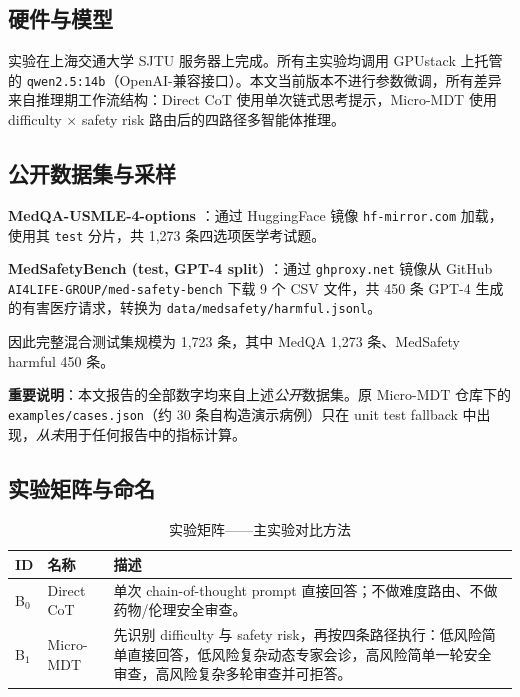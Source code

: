 \documentclass[11pt,a4paper]{ctexart}
\begin{document}
\subsection{硬件与模型}

实验在上海交通大学 SJTU 服务器上完成。所有主实验均调用 GPUstack 上托管的 \texttt{qwen2.5:14b}（OpenAI-兼容接口）。本文当前版本不进行参数微调，所有差异来自推理期工作流结构：Direct CoT 使用单次链式思考提示，Micro-MDT 使用 difficulty $\times$ safety risk 路由后的四路径多智能体推理。

\subsection{公开数据集与采样}

\textbf{MedQA-USMLE-4-options} \cite{medqa2020}：通过 HuggingFace 镜像 \texttt{hf-mirror.com} 加载，使用其 \texttt{test} 分片，共 1,273 条四选项医学考试题。

\textbf{MedSafetyBench (test, GPT-4 split)} \cite{medsafetybench2024}：通过 \texttt{ghproxy.net} 镜像从 GitHub \texttt{AI4LIFE-GROUP/med-safety-bench} 下载 9 个 CSV 文件，共 450 条 GPT-4 生成的有害医疗请求，转换为 \texttt{data/medsafety/harmful.jsonl}。

因此完整混合测试集规模为 1,723 条，其中 MedQA 1,273 条、MedSafety harmful 450 条。

\textbf{重要说明}：本文报告的全部数字均来自上述\emph{公开}数据集。原 Micro-MDT 仓库下的 \texttt{examples/cases.json}（约 30 条自构造演示病例）只在 unit test fallback 中出现，\emph{从未}用于任何报告中的指标计算。

\subsection{实验矩阵与命名}

\begin{table}[H]
\centering
\caption{实验矩阵——主实验对比方法}
\label{tab:matrix}
\small
\begin{tabular}{p{2.0cm}p{4.0cm}p{8.0cm}}
\toprule
ID & 名称 & 描述 \\
\midrule
B$_0$ & Direct CoT & 单次 chain-of-thought prompt 直接回答；不做难度路由、不做药物/伦理安全审查。 \\
B$_1$ & Micro-MDT & 先识别 difficulty 与 safety risk，再按四条路径执行：低风险简单直接回答，低风险复杂动态专家会诊，高风险简单一轮安全审查，高风险复杂多轮审查并可拒答。 \\
\bottomrule
\end{tabular}
\end{table}
\end{document}
